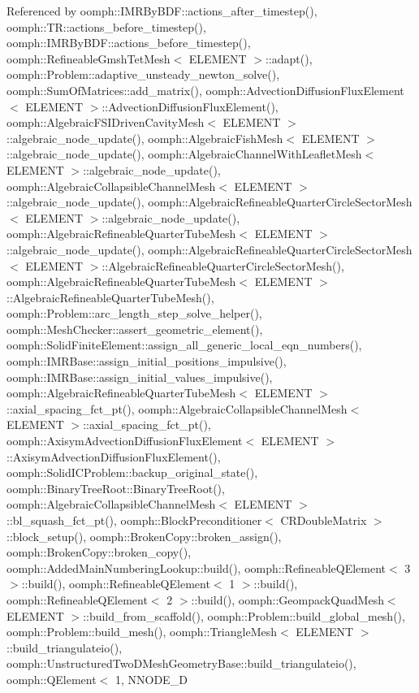 Referenced by oomph\+::\+I\+M\+R\+By\+B\+D\+F\+::actions\+\_\+after\+\_\+timestep(), oomph\+::\+T\+R\+::actions\+\_\+before\+\_\+timestep(), oomph\+::\+I\+M\+R\+By\+B\+D\+F\+::actions\+\_\+before\+\_\+timestep(), oomph\+::\+Refineable\+Gmsh\+Tet\+Mesh$<$ E\+L\+E\+M\+E\+N\+T $>$\+::adapt(), oomph\+::\+Problem\+::adaptive\+\_\+unsteady\+\_\+newton\+\_\+solve(), oomph\+::\+Sum\+Of\+Matrices\+::add\+\_\+matrix(), oomph\+::\+Advection\+Diffusion\+Flux\+Element$<$ E\+L\+E\+M\+E\+N\+T $>$\+::\+Advection\+Diffusion\+Flux\+Element(), oomph\+::\+Algebraic\+F\+S\+I\+Driven\+Cavity\+Mesh$<$ E\+L\+E\+M\+E\+N\+T $>$\+::algebraic\+\_\+node\+\_\+update(), oomph\+::\+Algebraic\+Fish\+Mesh$<$ E\+L\+E\+M\+E\+N\+T $>$\+::algebraic\+\_\+node\+\_\+update(), oomph\+::\+Algebraic\+Channel\+With\+Leaflet\+Mesh$<$ E\+L\+E\+M\+E\+N\+T $>$\+::algebraic\+\_\+node\+\_\+update(), oomph\+::\+Algebraic\+Collapsible\+Channel\+Mesh$<$ E\+L\+E\+M\+E\+N\+T $>$\+::algebraic\+\_\+node\+\_\+update(), oomph\+::\+Algebraic\+Refineable\+Quarter\+Circle\+Sector\+Mesh$<$ E\+L\+E\+M\+E\+N\+T $>$\+::algebraic\+\_\+node\+\_\+update(), oomph\+::\+Algebraic\+Refineable\+Quarter\+Tube\+Mesh$<$ E\+L\+E\+M\+E\+N\+T $>$\+::algebraic\+\_\+node\+\_\+update(), oomph\+::\+Algebraic\+Refineable\+Quarter\+Circle\+Sector\+Mesh$<$ E\+L\+E\+M\+E\+N\+T $>$\+::\+Algebraic\+Refineable\+Quarter\+Circle\+Sector\+Mesh(), oomph\+::\+Algebraic\+Refineable\+Quarter\+Tube\+Mesh$<$ E\+L\+E\+M\+E\+N\+T $>$\+::\+Algebraic\+Refineable\+Quarter\+Tube\+Mesh(), oomph\+::\+Problem\+::arc\+\_\+length\+\_\+step\+\_\+solve\+\_\+helper(), oomph\+::\+Mesh\+Checker\+::assert\+\_\+geometric\+\_\+element(), oomph\+::\+Solid\+Finite\+Element\+::assign\+\_\+all\+\_\+generic\+\_\+local\+\_\+eqn\+\_\+numbers(), oomph\+::\+I\+M\+R\+Base\+::assign\+\_\+initial\+\_\+positions\+\_\+impulsive(), oomph\+::\+I\+M\+R\+Base\+::assign\+\_\+initial\+\_\+values\+\_\+impulsive(), oomph\+::\+Algebraic\+Refineable\+Quarter\+Tube\+Mesh$<$ E\+L\+E\+M\+E\+N\+T $>$\+::axial\+\_\+spacing\+\_\+fct\+\_\+pt(), oomph\+::\+Algebraic\+Collapsible\+Channel\+Mesh$<$ E\+L\+E\+M\+E\+N\+T $>$\+::axial\+\_\+spacing\+\_\+fct\+\_\+pt(), oomph\+::\+Axisym\+Advection\+Diffusion\+Flux\+Element$<$ E\+L\+E\+M\+E\+N\+T $>$\+::\+Axisym\+Advection\+Diffusion\+Flux\+Element(), oomph\+::\+Solid\+I\+C\+Problem\+::backup\+\_\+original\+\_\+state(), oomph\+::\+Binary\+Tree\+Root\+::\+Binary\+Tree\+Root(), oomph\+::\+Algebraic\+Collapsible\+Channel\+Mesh$<$ E\+L\+E\+M\+E\+N\+T $>$\+::bl\+\_\+squash\+\_\+fct\+\_\+pt(), oomph\+::\+Block\+Preconditioner$<$ C\+R\+Double\+Matrix $>$\+::block\+\_\+setup(), oomph\+::\+Broken\+Copy\+::broken\+\_\+assign(), oomph\+::\+Broken\+Copy\+::broken\+\_\+copy(), oomph\+::\+Added\+Main\+Numbering\+Lookup\+::build(), oomph\+::\+Refineable\+Q\+Element$<$ 3 $>$\+::build(), oomph\+::\+Refineable\+Q\+Element$<$ 1 $>$\+::build(), oomph\+::\+Refineable\+Q\+Element$<$ 2 $>$\+::build(), oomph\+::\+Geompack\+Quad\+Mesh$<$ E\+L\+E\+M\+E\+N\+T $>$\+::build\+\_\+from\+\_\+scaffold(), oomph\+::\+Problem\+::build\+\_\+global\+\_\+mesh(), oomph\+::\+Problem\+::build\+\_\+mesh(), oomph\+::\+Triangle\+Mesh$<$ E\+L\+E\+M\+E\+N\+T $>$\+::build\+\_\+triangulateio(), oomph\+::\+Unstructured\+Two\+D\+Mesh\+Geometry\+Base\+::build\+\_\+triangulateio(), oomph\+::\+Q\+Element$<$ 1, N\+N\+O\+D\+E\+\_\+D 